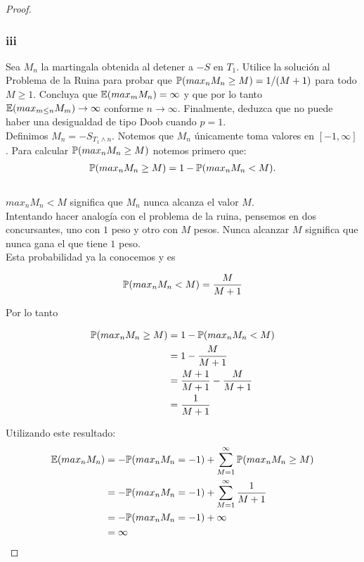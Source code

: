 \begin{proof}
		\subsubsection{iii}		
		Sea $M_n$ la martingala obtenida al detener a $-S$ en $T_1$. Utilice la solución al
		Problema de la Ruina para probar que $\mathbb{P}(max_n M_n \geq M) = 1/(M+1)$ para todo $M \geq 1$. Concluya que
		$\mathbb{E}(max_m M_n) = \infty$ y que por lo tanto $\mathbb{E}(max_{m\leq n} M_m) \rightarrow \infty$ conforme 
		$n \rightarrow \infty$. Finalmente, deduzca que no puede haber una desigualdad de tipo Doob cuando $p=1$.\\
		
			Definimos $M_n = -S_{T_1 \wedge n}$. Notemos que $M_n$ únicamente toma valores en $[-1, \infty]$.
			Para calcular $\mathbb{P}(max_n M_n \geq M)$ notemos primero que:
			\begin{align}
				\mathbb{P}(max_n M_n \geq M) = 1 - \mathbb{P}(max_n M_n < M).
			\end{align}\\
			
			$max_n M_n < M$ significa que $M_n$ nunca alcanza el valor $M$.\\
			 
			Intentando hacer analogía con el problema de la ruina, pensemos en dos concursantes,
			uno con $1$ peso y otro con $M$ pesos. Nunca alcanzar $M$ significa que nunca gana el que tiene $1$ peso.\\
			
			Esta probabilidad ya la conocemos y es 
			
			\begin{align*}
				\mathbb{P}(max_n M_n < M) = \frac{M}{M + 1}
			\end{align*}
				
			Por lo tanto
			
			\begin{align}
				\mathbb{P}(max_n M_n \geq M) 	&= 1 - \mathbb{P}(max_n M_n < M) \\
										&= 1 - \frac{M}{M + 1}\\
										&= \frac{M+1}{M+1} - \frac{M}{M + 1}\\
										&= \frac{1}{M+1}
			\end{align}
			
			Utilizando este resultado:
			\begin{align} \label{problema1_3:esperanza_del_maximo_de_M_n}
				\mathbb{E}(max_n M_n) 	&= - \mathbb{P}(max_n M_n = -1) + \sum_{M=1}^{\infty} \mathbb{P}(max_n M_n \geq M) \\
								&= - \mathbb{P}(max_n M_n = -1) + \sum_{M=1}^{\infty} \frac{1}{M+1} \\ 
								&= - \mathbb{P}(max_n M_n = -1) + \infty \\
								&= \infty
			\end{align}						
			

\end{proof}
